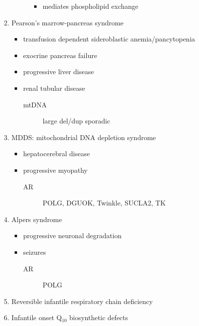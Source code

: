 \documentclass{scrartcl}
\begin{document}
\begin{enumerate}
\begin{enumerate}
\begin{description}
\begin{itemize}
\item mediates phospholipid exchange
\end{itemize}
\end{description}
\item Pearson's marrow-pancreas syndrome
\label{sec:orga47b97b}
\begin{itemize}
\item transfusion dependent sideroblastic anemia/pancytopenia
\item exocrine pancreas failure
\item progressive liver disease
\item renal tubular disease
\begin{description}
\item[{mtDNA}] large del/dup sporadic
\end{description}
\end{itemize}
\item MDDS: mitochondrial DNA depletion syndrome
\label{sec:orgc46c7e5}
\begin{itemize}
\item hepatocerebral disease
\item progressive myopathy
\begin{description}
\item[{AR}] POLG, DGUOK, Twinkle, SUCLA2, TK
\end{description}
\end{itemize}
\item Alpers syndrome
\label{sec:orge72629f}
\begin{itemize}
\item progressive neuronal degradation
\item seizures
\begin{description}
\item[{AR}] POLG
\end{description}
\end{itemize}
\item Reversible infantile respiratory chain deficiency
\label{sec:org6a94687}
\item Infantile onset Q\(_{\text{10}}\) biosynthetic defects
\label{sec:org06f17ee}
\end{enumerate}


\end{enumerate}
\end{document}
